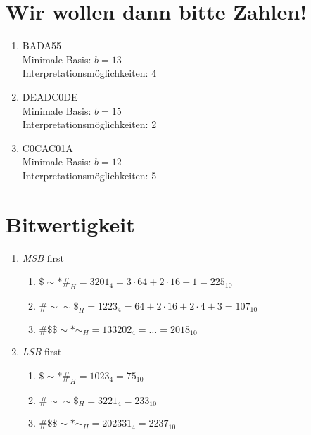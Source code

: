 \documentclass[a4paper]{article}
\begin{document}
\section{Wir wollen dann bitte Zahlen!}
\begin{enumerate}[label=\alph*)]
	\item BADA55 \\
	Minimale Basis:  $b = 13$ \\
	Interpretationsmöglichkeiten: 4


	\item DEADC0DE \\
	Minimale Basis:  $b = 15$ \\
	Interpretationsmöglichkeiten: 2

	\item C0CAC01A \\
	Minimale Basis:  $b = 12$ \\
	Interpretationsmöglichkeiten: 5
\end{enumerate}

\section{Bitwertigkeit}
\begin{enumerate}[label=\alph*)]
    \item \emph{MSB} first
        \begin{enumerate}[label=\Roman*)]
            \item $ \$\sim*\#_H = 3201_4 = 3 \cdot 64 + 2 \cdot 16 + 1 = 225_{10} $

            \item $ \#\sim\sim\$_H = 1223_4 = 64 + 2 \cdot 16 + 2 \cdot 4 + 3 = 107_{10} $

            \item $ \#\$\$\sim*\sim_H = 133202_4 = \dots = 2018_{10} $
        \end{enumerate}

    \item \emph{LSB} first
        \begin{enumerate}[label=\Roman*)]
            \item $ \$\sim*\#_H = 1023_4 = 75_{10} $

            \item $ \#\sim\sim\$_H = 3221_4 = 233_{10} $

            \item $ \#\$\$\sim*\sim_H = 202331_4 = 2237_{10} $
        \end{enumerate}
\end{enumerate}
\end{document}
